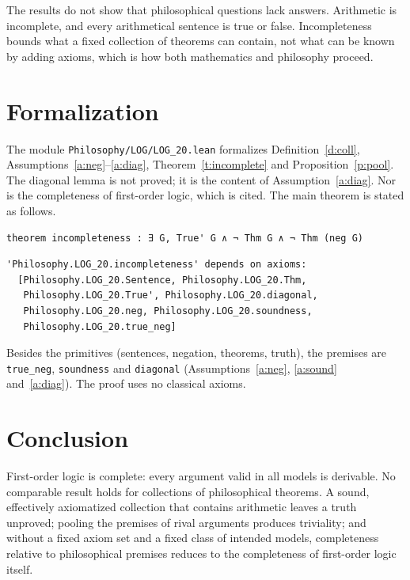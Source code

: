 \documentclass{situationist-preprint}
\begin{document}
The results do not show that philosophical questions lack answers. Arithmetic is incomplete, and every arithmetical sentence is true or false. Incompleteness bounds what a fixed collection of theorems can contain, not what can be known by adding axioms, which is how both mathematics and philosophy proceed.

\section{Formalization}

The module \nolinkurl{Philosophy/LOG/LOG_20.lean} formalizes Definition~\ref{d:coll}, Assumptions~\ref{a:neg}--\ref{a:diag}, Theorem~\ref{t:incomplete} and Proposition~\ref{p:pool}. The diagonal lemma is not proved; it is the content of Assumption~\ref{a:diag}. Nor is the completeness of first-order logic, which is cited. The main theorem is stated as follows.

\begin{lstlisting}
theorem incompleteness : ∃ G, True' G ∧ ¬ Thm G ∧ ¬ Thm (neg G)
\end{lstlisting}

\begin{lstlisting}
'Philosophy.LOG_20.incompleteness' depends on axioms:
  [Philosophy.LOG_20.Sentence, Philosophy.LOG_20.Thm,
   Philosophy.LOG_20.True', Philosophy.LOG_20.diagonal,
   Philosophy.LOG_20.neg, Philosophy.LOG_20.soundness,
   Philosophy.LOG_20.true_neg]
\end{lstlisting}

Besides the primitives (sentences, negation, theorems, truth), the premises are \texttt{true\_neg}, \texttt{soundness} and \texttt{diagonal} (Assumptions~\ref{a:neg}, \ref{a:sound} and~\ref{a:diag}). The proof uses no classical axioms.

\section{Conclusion}

First-order logic is complete: every argument valid in all models is derivable. No comparable result holds for collections of philosophical theorems. A sound, effectively axiomatized collection that contains arithmetic leaves a truth unproved; pooling the premises of rival arguments produces triviality; and without a fixed axiom set and a fixed class of intended models, completeness relative to philosophical premises reduces to the completeness of first-order logic itself.
\end{document}

